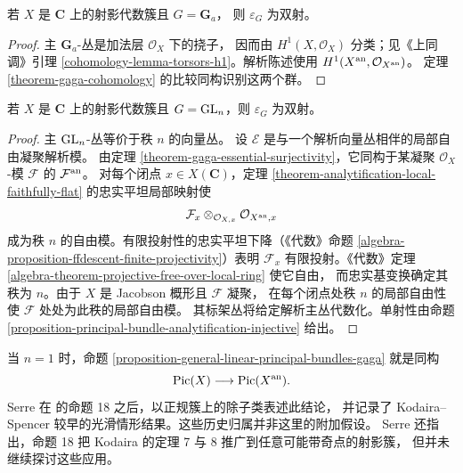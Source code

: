 \begin{proposition}
\label{proposition-additive-principal-bundles-gaga}
\begin{reference}
\cite[\S 4，第 20 号，命题 17]{GAGA}
\end{reference}
若 $X$ 是 $\mathbf C$ 上的射影代数簇且 $G=\mathbf G_a$，
则 $\varepsilon_G$ 为双射。
\end{proposition}

\begin{proof}
主 $\mathbf G_a$-丛是加法层 $\mathcal O_X$ 下的挠子，
因而由 $H^1(X,\mathcal O_X)$ 分类；见《上同调》引理
\ref{cohomology-lemma-torsors-h1}。解析陈述使用
$H^1(X^{\rm an},\mathcal O_{X^{\rm an}})$。
定理 \ref{theorem-gaga-cohomology} 的比较同构识别这两个群。
\end{proof}

\begin{proposition}
\label{proposition-general-linear-principal-bundles-gaga}
\begin{reference}
\cite[\S 4，第 20 号，命题 18]{GAGA}
\end{reference}
若 $X$ 是 $\mathbf C$ 上的射影代数簇且
$G=\mathop{\rm GL}_n$，则 $\varepsilon_G$ 为双射。
\end{proposition}

\begin{proof}
主 $\mathop{\rm GL}_n$-丛等价于秩 $n$ 的向量丛。
设 $\mathcal E$ 是与一个解析向量丛相伴的局部自由凝聚解析模。
由定理 \ref{theorem-gaga-essential-surjectivity}，它同构于某凝聚
$\mathcal O_X$-模 $\mathcal F$ 的 $\mathcal F^{\rm an}$。
对每个闭点 $x\in X(\mathbf C)$，定理
\ref{theorem-analytification-local-faithfully-flat} 的忠实平坦局部映射使
$$
\mathcal F_x\otimes_{\mathcal O_{X,x}}
\mathcal O_{X^{\rm an},x}
$$
成为秩 $n$ 的自由模。有限投射性的忠实平坦下降（《代数》命题
\ref{algebra-proposition-ffdescent-finite-projectivity}）表明
$\mathcal F_x$ 有限投射。《代数》定理
\ref{algebra-theorem-projective-free-over-local-ring} 使它自由，
而忠实基变换确定其秩为 $n$。由于 $X$ 是 Jacobson 概形且 $\mathcal F$ 凝聚，
在每个闭点处秩 $n$ 的局部自由性使 $\mathcal F$ 处处为此秩的局部自由模。
其标架丛将给定解析主丛代数化。单射性由命题
\ref{proposition-principal-bundle-analytification-injective} 给出。
\end{proof}

\begin{remark}[线丛与历史表述]
\label{remark-line-bundles-gaga}
当 $n=1$ 时，命题 \ref{proposition-general-linear-principal-bundles-gaga}
就是同构
$$
\mathop{\rm Pic}(X)\longrightarrow\mathop{\rm Pic}(X^{\rm an}).
$$
Serre 在 \cite[\S 4，第 20 号]{GAGA} 的命题 18 之后，以正规簇上的除子类表述此结论，
并记录了 Kodaira--Spencer 较早的光滑情形结果。这些历史归属并非这里的附加假设。
Serre 还指出，命题 18 把 Kodaira 的定理 7 与 8 推广到任意可能带奇点的射影簇，
但并未继续探讨这些应用。
\end{remark}

